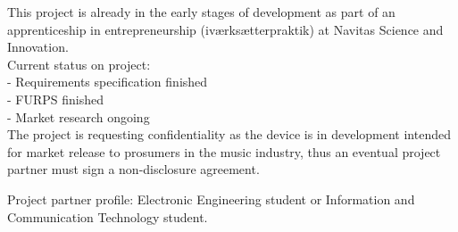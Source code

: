This project is already in the early stages of development as part of an apprenticeship in
entrepreneurship (iværksætterpraktik) at Navitas Science and Innovation. \\
Current status on project: \\
- Requirements specification finished \\
- FURPS finished \\
- Market research ongoing \\
The project is requesting confidentiality as the device is in development intended for market release to
prosumers in the music industry, thus an eventual project partner must sign a non-disclosure
agreement. \newline

Project partner profile: Electronic Engineering student or Information and Communication
Technology student.